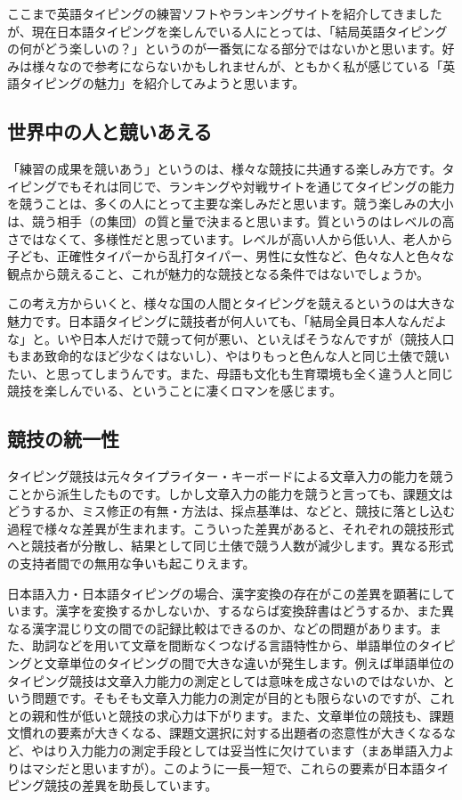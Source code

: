 ここまで英語タイピングの練習ソフトやランキングサイトを紹介してきましたが、現在日本語タイピングを楽しんでいる人にとっては、「結局英語タイピングの何がどう楽しいの？」というのが一番気になる部分ではないかと思います。好みは様々なので参考にならないかもしれませんが、ともかく私が感じている「英語タイピングの魅力」を紹介してみようと思います。

\subsection{世界中の人と競いあえる}

「練習の成果を競いあう」というのは、様々な競技に共通する楽しみ方です。タイピングでもそれは同じで、ランキングや対戦サイトを通じてタイピングの能力を競うことは、多くの人にとって主要な楽しみだと思います。競う楽しみの大小は、競う相手（の集団）の質と量で決まると思います。質というのはレベルの高さではなくて、多様性だと思っています。レベルが高い人から低い人、老人から子ども、正確性タイパーから乱打タイパー、男性に女性など、色々な人と色々な観点から競えること、これが魅力的な競技となる条件ではないでしょうか。

この考え方からいくと、様々な国の人間とタイピングを競えるというのは大きな魅力です。日本語タイピングに競技者が何人いても、「結局全員日本人なんだよな」と。いや日本人だけで競って何が悪い、といえばそうなんですが（競技人口もまあ致命的なほど少なくはないし）、やはりもっと色んな人と同じ土俵で競いたい、と思ってしまうんです。また、母語も文化も生育環境も全く違う人と同じ競技を楽しんでいる、ということに凄くロマンを感じます。

\subsection{競技の統一性}

タイピング競技は元々タイプライター・キーボードによる文章入力の能力を競うことから派生したものです。しかし文章入力の能力を競うと言っても、課題文はどうするか、ミス修正の有無・方法は、採点基準は、などと、競技に落とし込む過程で様々な差異が生まれます。こういった差異があると、それぞれの競技形式へと競技者が分散し、結果として同じ土俵で競う人数が減少します。異なる形式の支持者間での無用な争いも起こりえます。

日本語入力・日本語タイピングの場合、漢字変換の存在がこの差異を顕著にしています。漢字を変換するかしないか、するならば変換辞書はどうするか、また異なる漢字混じり文の間での記録比較はできるのか、などの問題があります。また、助詞などを用いて文章を間断なくつなげる言語特性から、単語単位のタイピングと文章単位のタイピングの間で大きな違いが発生します。例えば単語単位のタイピング競技は文章入力能力の測定としては意味を成さないのではないか、という問題です。そもそも文章入力能力の測定が目的とも限らないのですが、これとの親和性が低いと競技の求心力は下がります。また、文章単位の競技も、課題文慣れの要素が大きくなる、課題文選択に対する出題者の恣意性が大きくなるなど、やはり入力能力の測定手段としては妥当性に欠けています（まあ単語入力よりはマシだと思いますが）。このように一長一短で、これらの要素が日本語タイピング競技の差異を助長しています。


